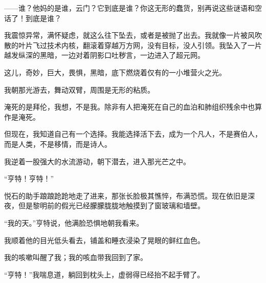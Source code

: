 \documentclass[AutoFakeBold=true]{book}
\begin{document}
{\kaishu ——谁？他妈的是谁，云门？它到底是谁？你这无形的蠢货，别再说这些谜语和空话了！到底是谁？}

{}

{}

{\heiti [滚吧！]}

\vspace*{1em}

我震惊异常，满怀疑虑，就这么往下坠去，或者是被抛了出去。我就像一片被风吹散的叶片飞过技术内核，翻滚着穿越万方网，没有目标，没人引领。我坠入了一片越发纵深的黑暗，一边对着阴影口吐秽言，一边进入了超元网。

这儿，奇妙，巨大，畏惧，黑暗，底下燃烧着仅有的一小堆营火之光。

我朝那光游去，舞动双臂，周围是无形的粘质。

{\kaishu 淹死的是拜伦，}我想，{\kaishu 不是我。}除非有人把淹死在自己的血泊和肺组织残余中也算作是淹死。

但现在，我知道自己有一个选择。我能选择活下去，成为一个凡人，不是赛伯人，而是人类，不是移情，而是诗人。

我逆着一股强大的水流游动，朝下潜去，进入那光芒之中。

\vspace*{1em}

``亨特！亨特！''

悦石的助手踉踉跄跄地走了进来，那张长脸极其憔悴，布满恐慌。现在依旧是深夜，但是黎明前的假光已经朦朦胧胧地触摸到了窗玻璃和墙壁。

``我的天。''亨特说，他满脸恐惧地朝我看来。

我顺着他的目光低头看去，铺盖和睡衣浸染了晃眼的鲜红血色。

我的咳嗽叫醒了我；我的咳血带我回到了家。

``亨特！''我喘息道，躺回到枕头上，虚弱得已经抬不起手臂了。
\end{document}

